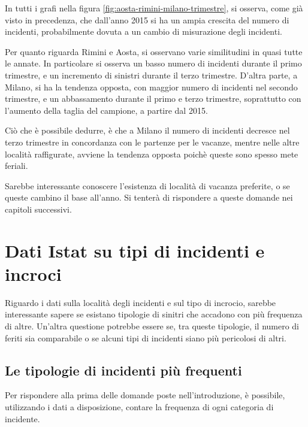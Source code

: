 \documentclass[a4paper,12pt]{report}
\begin{document}
In tutti i grafi nella figura \ref{fig:aosta-rimini-milano-trimestre}, 
si osserva, come già visto in precedenza, che dall'anno 2015 si ha un ampia crescita  
del numero di incidenti, probabilmente dovuta a un cambio di misurazione 
degli incidenti. 

Per quanto riguarda Rimini e Aosta, si osservano varie similitudini in quasi 
tutte le annate. In particolare si osserva un basso numero di incidenti 
durante il primo trimestre, e un incremento di sinistri durante il terzo trimestre.
D'altra parte, a Milano, si ha la tendenza opposta, con maggior numero di 
incidenti nel secondo trimestre, e un abbassamento durante il primo 
e terzo trimestre, soprattutto con l'aumento della taglia del campione, 
a partire dal 2015.

Ciò che è possibile dedurre, è che a Milano il numero di incidenti decresce 
nel terzo trimestre in concordanza con le partenze per le vacanze, mentre nelle 
altre località raffigurate, avviene la tendenza opposta poichè 
queste sono spesso mete feriali.

Sarebbe interessante conoscere l'esistenza di località di vacanza preferite, 
o se queste cambino il base all'anno. 
Si tenterà di rispondere a queste domande nei capitoli successivi.

\section{Dati Istat su tipi di incidenti e incroci}

Riguardo i dati sulla località degli incidenti e sul tipo di incrocio, 
sarebbe interessante sapere se esistano tipologie di sinitri che accadono 
con più frequenza di altre. 
Un'altra questione potrebbe essere se, tra queste tipologie, il numero di feriti 
sia comparabile o se alcuni tipi di incidenti siano più pericolosi di altri.

\subsection{Le tipologie di incidenti più frequenti}

Per rispondere alla prima delle domande poste nell'introduzione, è possibile, 
utilizzando i dati a disposizione, contare la frequenza di ogni categoria di incidente.
\end{document}
